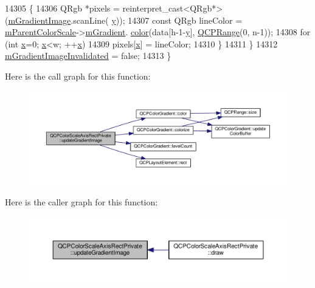 \begin{DoxyCode}
14305     \{
14306       QRgb *pixels = \textcolor{keyword}{reinterpret\_cast<}QRgb*\textcolor{keyword}{>}(\hyperlink{class_q_c_p_color_scale_axis_rect_private_ad4f7c8ee1c6012d9950870811773119c}{mGradientImage}.scanLine(
      \hyperlink{_comparision_pictures_2_createtest_image_8m_a2fb1c5cf58867b5bbc9a1b145a86f3a0}{y}));
14307       \textcolor{keyword}{const} QRgb lineColor = \hyperlink{class_q_c_p_color_scale_axis_rect_private_a311c73f51a4cb0b556388197833cf099}{mParentColorScale}->\hyperlink{class_q_c_p_color_scale_ae195a385032066b5c46cc3301af58922}{mGradient}.
      \hyperlink{class_q_c_p_color_gradient_a0599545c859268b025d2060dea741cea}{color}(data[h-1-\hyperlink{_comparision_pictures_2_createtest_image_8m_a2fb1c5cf58867b5bbc9a1b145a86f3a0}{y}], \hyperlink{class_q_c_p_range}{QCPRange}(0, n-1));
14308       \textcolor{keywordflow}{for} (\textcolor{keywordtype}{int} \hyperlink{_comparision_pictures_2_createtest_image_8m_a9336ebf25087d91c818ee6e9ec29f8c1}{x}=0; \hyperlink{_comparision_pictures_2_createtest_image_8m_a9336ebf25087d91c818ee6e9ec29f8c1}{x}<w; ++\hyperlink{_comparision_pictures_2_createtest_image_8m_a9336ebf25087d91c818ee6e9ec29f8c1}{x})
14309         pixels[\hyperlink{_comparision_pictures_2_createtest_image_8m_a9336ebf25087d91c818ee6e9ec29f8c1}{x}] = lineColor;
14310     \}
14311   \}
14312   \hyperlink{class_q_c_p_color_scale_axis_rect_private_a2c0b15b071e1f93006b48b5be022a631}{mGradientImageInvalidated} = \textcolor{keyword}{false};
14313 \}
\end{DoxyCode}


Here is the call graph for this function\+:\nopagebreak
\begin{figure}[H]
\begin{center}
\leavevmode
\includegraphics[width=350pt]{class_q_c_p_color_scale_axis_rect_private_a73754cab312aeaddea1bfcc67cc079ac_cgraph}
\end{center}
\end{figure}




Here is the caller graph for this function\+:\nopagebreak
\begin{figure}[H]
\begin{center}
\leavevmode
\includegraphics[width=350pt]{class_q_c_p_color_scale_axis_rect_private_a73754cab312aeaddea1bfcc67cc079ac_icgraph}
\end{center}
\end{figure}




